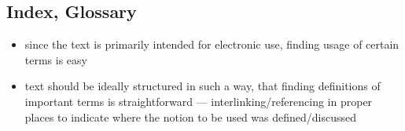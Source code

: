 \subsection{Index, Glossary}%
\label{sub:Index Glossary}

\begin{itemize}
    \item since the text is primarily intended for electronic use, finding usage of certain terms is easy
    \item text should be ideally structured in such a way, that finding definitions of important terms is straightforward --- interlinking/referencing in proper places to indicate where the notion to be used was defined/discussed
\end{itemize}
